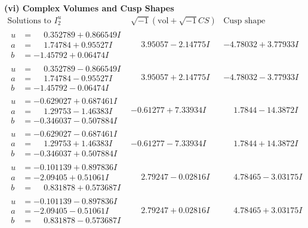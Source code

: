 \documentclass[1p]{elsarticle_modified}
\theoremstyle{definition}
\newcommand{\I}{\sqrt{-1}}
\begin{document}
\newpage\flushleft \textbf{(vi) Complex Volumes and Cusp Shapes}
$$\begin{array}{c|c|c}  
\text{Solutions to }I^u_{2}& \I (\text{vol} + \sqrt{-1}CS) & \text{Cusp shape}\\
 \hline 
\begin{aligned}
u &= \phantom{-}0.352789 + 0.866549 I \\
a &= \phantom{-}1.74784 + 0.95527 I \\
b &= -1.45792 + 0.06474 I\end{aligned}
 & \phantom{-}3.95057 - 2.14775 I & -4.78032 + 3.77933 I \\ \hline\begin{aligned}
u &= \phantom{-}0.352789 - 0.866549 I \\
a &= \phantom{-}1.74784 - 0.95527 I \\
b &= -1.45792 - 0.06474 I\end{aligned}
 & \phantom{-}3.95057 + 2.14775 I & -4.78032 - 3.77933 I \\ \hline\begin{aligned}
u &= -0.629027 + 0.687461 I \\
a &= \phantom{-}1.29753 - 1.46383 I \\
b &= -0.346037 - 0.507884 I\end{aligned}
 & -0.61277 + 7.33934 I & \phantom{-}1.7844 - 14.3872 I \\ \hline\begin{aligned}
u &= -0.629027 - 0.687461 I \\
a &= \phantom{-}1.29753 + 1.46383 I \\
b &= -0.346037 + 0.507884 I\end{aligned}
 & -0.61277 - 7.33934 I & \phantom{-}1.7844 + 14.3872 I \\ \hline\begin{aligned}
u &= -0.101139 + 0.897836 I \\
a &= -2.09405 + 0.51061 I \\
b &= \phantom{-}0.831878 + 0.573687 I\end{aligned}
 & \phantom{-}2.79247 - 0.02816 I & \phantom{-}4.78465 - 3.03175 I \\ \hline\begin{aligned}
u &= -0.101139 - 0.897836 I \\
a &= -2.09405 - 0.51061 I \\
b &= \phantom{-}0.831878 - 0.573687 I\end{aligned}
 & \phantom{-}2.79247 + 0.02816 I & \phantom{-}4.78465 + 3.03175 I \\ \hline\begin{aligned}

\end{aligned}
\end{array}$$
\end{document}
